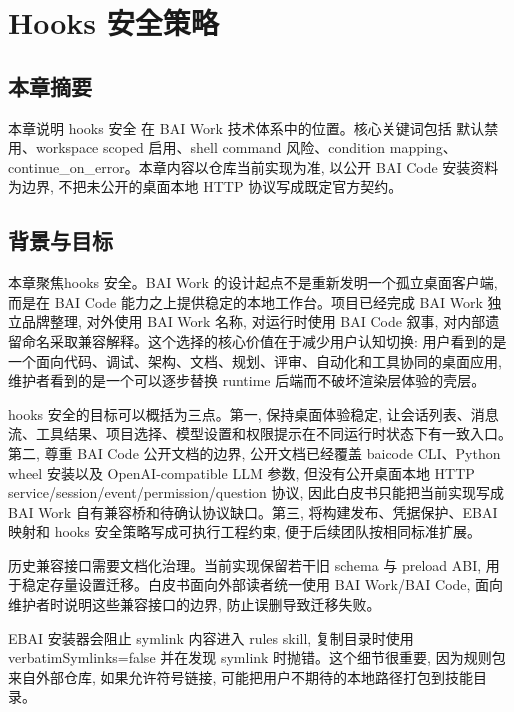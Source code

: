 \chapter{Hooks 安全策略}
\section{本章摘要}
本章说明 hooks 安全 在 BAI Work 技术体系中的位置。核心关键词包括 默认禁用、workspace scoped 启用、shell command 风险、condition mapping、continue\_on\_error。本章内容以仓库当前实现为准, 以公开 BAI Code 安装资料为边界, 不把未公开的桌面本地 HTTP 协议写成既定官方契约。

\section{背景与目标}
本章聚焦hooks 安全。BAI Work 的设计起点不是重新发明一个孤立桌面客户端, 而是在 BAI Code 能力之上提供稳定的本地工作台。项目已经完成 BAI Work 独立品牌整理, 对外使用 BAI Work 名称, 对运行时使用 BAI Code 叙事, 对内部遗留命名采取兼容解释。这个选择的核心价值在于减少用户认知切换: 用户看到的是一个面向代码、调试、架构、文档、规划、评审、自动化和工具协同的桌面应用, 维护者看到的是一个可以逐步替换 runtime 后端而不破坏渲染层体验的壳层。

hooks 安全的目标可以概括为三点。第一, 保持桌面体验稳定, 让会话列表、消息流、工具结果、项目选择、模型设置和权限提示在不同运行时状态下有一致入口。第二, 尊重 BAI Code 公开文档的边界, 公开文档已经覆盖 baicode CLI、Python wheel 安装以及 OpenAI-compatible LLM 参数, 但没有公开桌面本地 HTTP service/session/event/permission/question 协议, 因此白皮书只能把当前实现写成 BAI Work 自有兼容桥和待确认协议缺口。第三, 将构建发布、凭据保护、EBAI 映射和 hooks 安全策略写成可执行工程约束, 便于后续团队按相同标准扩展。

历史兼容接口需要文档化治理。当前实现保留若干旧 schema 与 preload ABI, 用于稳定存量设置迁移。白皮书面向外部读者统一使用 BAI Work/BAI Code, 面向维护者时说明这些兼容接口的边界, 防止误删导致迁移失败。

EBAI 安装器会阻止 symlink 内容进入 rules skill, 复制目录时使用 verbatimSymlinks=false 并在发现 symlink 时抛错。这个细节很重要, 因为规则包来自外部仓库, 如果允许符号链接, 可能把用户不期待的本地路径打包到技能目录。

